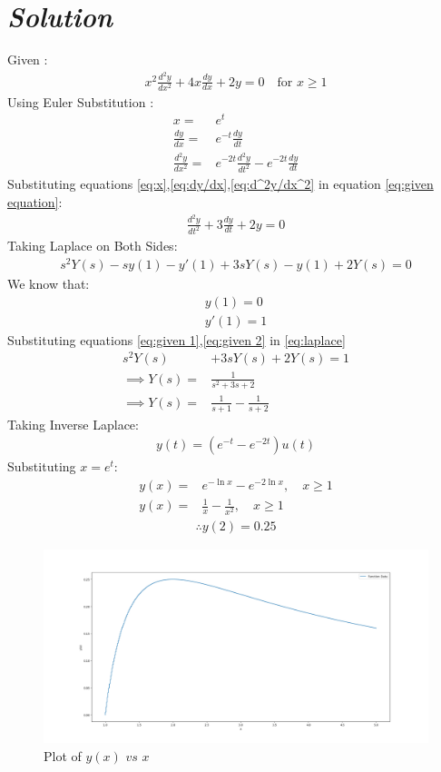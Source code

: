 \documentclass[journal,12pt,twocolumn]{IEEEtran}
\theoremstyle{remark}
\begin{document}
\section*{\textit{\textbf{Solution}}}
\noindent Given : 
\begin{align}
x^2\frac{d^2y}{dx^2} + 4x\frac{dy}{dx} + 2y = 0 \quad \text{for } x\geq 1 \label{eq:given equation}
\end{align}
Using Euler Substitution : 
\begin{align}
x= & e^t \label{eq:x}\\
\frac{dy}{dx}= & e^{-t}\frac{dy}{dt}\label{eq:dy/dx}\\
\frac{d^2y}{dx^2} = & e^{-2t}\frac{d^2y}{dt^2} - e^{-2t}\frac{dy}{dt}\label{eq:d^2y/dx^2}
\end{align}
Substituting equations \eqref{eq:x},\eqref{eq:dy/dx},\eqref{eq:d^2y/dx^2} in equation \eqref{eq:given equation}:
\begin{align}
\frac{d^2y}{dt^2} + 3\frac{dy}{dt} + 2y = 0
\end{align}
Taking Laplace on Both Sides:
\begin{align}
s^2 Y(s) - sy(1)-y'(1) + 3{sY(s) - y(1)} + 2Y(s)= 0\label{eq:laplace}
\end{align}
We know that:
\begin{align}
y(1)=0\label{eq:given 1}\\
y'(1)=1\label{eq:given 2}
\end{align}
Substituting equations \eqref{eq:given 1},\eqref{eq:given 2} in \eqref{eq:laplace}
\begin{align}
s^2Y(s)& + 3sY(s) +2Y(s)= 1\\
\implies Y(s)=&\frac{1}{s^2 + 3s + 2 }\\
\implies Y(s)=&\frac{1}{s+1} - \frac{1}{s+2}
\end{align}
Taking Inverse Laplace:
\begin{align}
y(t) = (e^{-t} - e^{-2t})u(t)
\end{align}
Substituting $x=e^t$:
\begin{align}
y(x)=& e^{-\ln{x}} - e^{-2\ln{x}},\quad x\geq 1 \\
y(x)=& \frac{1}{x} - \frac{1}{x^2},\quad x\geq 1 
\end{align}
\begin{align}
    \therefore y(2) = 0.25
\end{align}
\begin{figure}[ht]
    \centering
    \includegraphics[width=\columnwidth]{figs/fig.png}
    \caption{Plot of $y(x)$ $vs$ $x$}
    \label{fig: GATE AE-54(2023)}
\end{figure}
\end{document}
